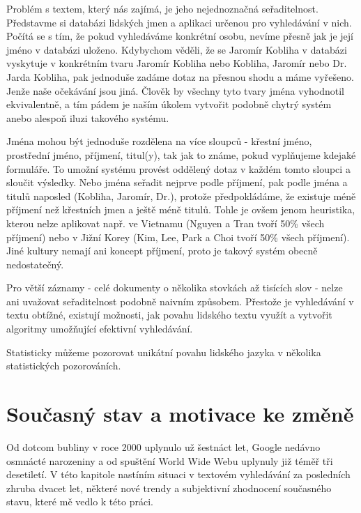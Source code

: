 \documentclass[11pt]{article}
\begin{document}
Problém s textem, který nás zajímá, je jeho nejednoznačná seřaditelnost.
Představme si databázi lidských jmen a aplikaci určenou pro vyhledávání v nich.
Počítá se s tím, že pokud vyhledáváme konkrétní osobu, nevíme přesně jak je
její jméno v databázi uloženo. Kdybychom věděli, že se Jaromír Kobliha v
databázi vyskytuje v konkrétním tvaru Jaromír Kobliha nebo Kobliha, Jaromír
nebo Dr. Jarda Kobliha, pak jednoduše zadáme dotaz na přesnou shodu a máme
vyřešeno. Jenže naše očekávání jsou jiná. Člověk by všechny tyto tvary jména
vyhodnotil ekvivalentně, a tím pádem je naším úkolem vytvořit podobně chytrý
systém anebo alespoň iluzi takového systému. 

Jména mohou být jednoduše rozdělena na více sloupců - křestní jméno, prostřední
jméno, příjmení, titul(y), tak jak to známe, pokud vyplňujeme kdejaké
formuláře. To umožní systému provést oddělený dotaz v každém tomto sloupci a
sloučit výsledky. Nebo jména seřadit nejprve podle příjmení, pak podle jména a
titulů naposled (Kobliha, Jaromír, Dr.), protože předpokládáme, že existuje
méně příjmení než křestních jmen a ještě méně titulů. Tohle je ovšem jenom
heuristika, kterou nelze aplikovat např. ve Vietnamu (Nguyen a Tran tvoří 50\%
všech příjmení) nebo v Jižní Korey (Kim, Lee, Park a Choi tvoří 50\% všech
příjmení). Jiné kultury nemají ani koncept příjmení, proto je takový systém
obecně nedostatečný.

Pro větší záznamy - celé dokumenty o několika stovkách až tisících slov - nelze
ani uvažovat seřaditelnost podobně naivním způsobem. Přestože je vyhledávání v
textu obtížné, existují možnosti, jak povahu lidského textu využít a vytvořit
algoritmy umožňující efektivní vyhledávání.

Statisticky můžeme pozorovat unikátní povahu lidského jazyka v několika statistických pozorováních.

\section{Současný stav a motivace ke změně}
Od dotcom bubliny v roce 2000 uplynulo už šestnáct let, Google nedávno
osmnácté narozeniny a od spuštění World Wide Webu uplynuly již téměř tři
desetiletí. V této kapitole nastíním situaci v textovém vyhledávání za
posledních zhruba dvacet let, některé nové trendy a subjektivní
zhodnocení současného stavu, které mě vedlo k této práci.
\end{document}
